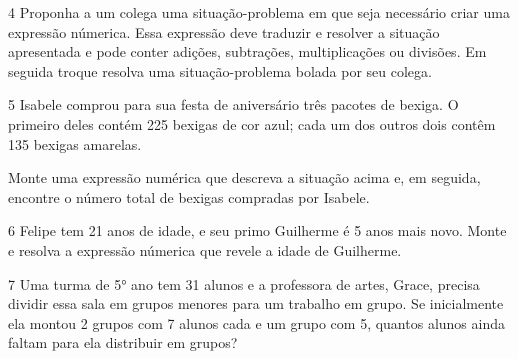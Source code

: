 \begin{emptybox}
\bigskip
\bigskip
\bigskip
\bigskip
\end{emptybox}

\pagebreak

\num{4} Proponha a um colega uma situação-problema em que seja necessário
criar uma expressão númerica. Essa expressão deve traduzir e resolver a
situação apresentada e pode conter adições, subtrações, multiplicações 
ou divisões. Em seguida troque resolva uma situação-problema bolada por 
seu colega.

\begin{emptybox}
\bigskip
\bigskip
\bigskip
\bigskip
\bigskip
\bigskip
\bigskip
\bigskip
\end{emptybox}

\num{5} Isabele comprou para sua festa de aniversário três pacotes de
bexiga. O primeiro deles contém 225 bexigas de cor azul; cada um dos
outros dois contêm 135 bexigas amarelas.

Monte uma expressão numérica que descreva a situação acima 
e, em seguida, encontre o número total de bexigas compradas por Isabele.

\begin{emptybox}
\bigskip
\bigskip
\bigskip
\bigskip
\bigskip
\bigskip
\bigskip
\end{emptybox}

\num{6} Felipe tem 21 anos de idade, e seu primo Guilherme é 5 anos mais
novo. Monte e resolva a expressão númerica que revele a
idade de Guilherme.

\begin{emptybox}
\bigskip
\bigskip
\bigskip
\bigskip
\end{emptybox}
\pagebreak

\num{7} Uma turma de 5° ano tem 31 alunos e a professora de artes, Grace,
precisa dividir essa sala em grupos menores para um trabalho em grupo.
Se inicialmente ela montou 2 grupos com 7 alunos cada e um grupo com 5,
quantos alunos ainda faltam para ela distribuir em grupos?

\begin{emptybox}
\bigskip
\bigskip
\bigskip
\end{emptybox}

